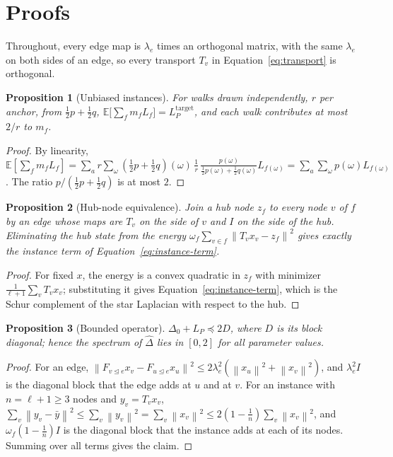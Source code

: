 \documentclass{article}
\newtheorem{proposition}{Proposition}
\newcommand{\norm}[1]{\left\lVert #1\right\rVert}
\newcommand{\inc}{\trianglelefteq}
\begin{document}
\section{Proofs}
\label{app:proofs}
Throughout, every edge map is $\lambda_e$ times an orthogonal matrix, with the same $\lambda_e$ on both sides of an edge, so every transport $T_v$ in Equation~\eqref{eq:transport} is orthogonal.

\begin{proposition}[Unbiased instances]
For walks drawn independently, $r$ per anchor, from $\tfrac12p+\tfrac12q$, $\mathbb{E}\bigl[\sum_f m_fL_f\bigr]=L_P^{\mathrm{target}}$, and each walk contributes at most $2/r$ to $m_f$.
\end{proposition}
\begin{proof}
By linearity, $\mathbb{E}[\sum_fm_fL_f]=\sum_a r\sum_\omega(\tfrac12p+\tfrac12q)(\omega)\,\tfrac1r\,\tfrac{p(\omega)}{\frac12p(\omega)+\frac12q(\omega)}L_{f(\omega)}=\sum_a\sum_\omega p(\omega)L_{f(\omega)}$. The ratio $p/(\tfrac12p+\tfrac12q)$ is at most $2$.
\end{proof}

\begin{proposition}[Hub-node equivalence]
Join a hub node $z_f$ to every node $v$ of $f$ by an edge whose maps are $T_v$ on the side of $v$ and $I$ on the side of the hub. Eliminating the hub state from the energy $\omega_f\sum_{v\in f}\norm{T_vx_v-z_f}^2$ gives exactly the instance term of Equation~\eqref{eq:instance-term}.
\end{proposition}
\begin{proof}
For fixed $x$, the energy is a convex quadratic in $z_f$ with minimizer $\frac{1}{\ell+1}\sum_vT_vx_v$; substituting it gives Equation~\eqref{eq:instance-term}, which is the Schur complement of the star Laplacian with respect to the hub.
\end{proof}

\begin{proposition}[Bounded operator]
$\Delta_0+L_P\preceq 2D$, where $D$ is its block diagonal; hence the spectrum of $\hat{\Delta}$ lies in $[0,2]$ for all parameter values.
\end{proposition}
\begin{proof}
For an edge, $\norm{F_{v\inc e}x_v-F_{u\inc e}x_u}^2\le2\lambda_e^2(\norm{x_u}^2+\norm{x_v}^2)$, and $\lambda_e^2I$ is the diagonal block that the edge adds at $u$ and at $v$. For an instance with $n=\ell+1\ge3$ nodes and $y_v=T_vx_v$, $\sum_v\norm{y_v-\bar y}^2\le\sum_v\norm{y_v}^2=\sum_v\norm{x_v}^2\le2(1-\tfrac1n)\sum_v\norm{x_v}^2$, and $\omega_f(1-\frac1n)I$ is the diagonal block that the instance adds at each of its nodes. Summing over all terms gives the claim.
\end{proof}
\end{document}
